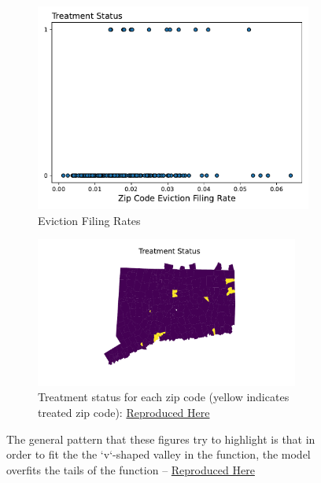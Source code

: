 \documentclass[a4paper,12pt]{article}
\begin{document}
\begin{figure}[htbp]
\centering
\begin{subfigure}{.48\textwidth}
    \centering
    \includegraphics[width=.95\linewidth]{figures/rtc/context/eviction_filing_rate_per_pop.pdf}
    \caption{Eviction Filing Rates}
    \label{fig:efr}
\end{subfigure}
\begin{subfigure}{.48\textwidth}
    \centering
\includegraphics[width=0.95\textwidth]{figures/rtc/maps/zip_code_status.pdf}  
        \caption{Treatment status for each zip code (yellow indicates treated zip code): \href{https://github.com/pharringtonp19/evictions/blob/main/scripts/joint/maps/treatment_status.py}{Reproduced Here}}
    \label{fig:treated_areas}
\end{subfigure}
\caption{The general pattern that these figures try to highlight is that in order to fit the the `v`-shaped valley in the function, the model overfits the tails of the function -- \href{https://github.com/pharringtonp19/jmp_paper/blob/main/notebooks/gradient_descent_motivating_example.ipynb}{Reproduced Here}}
\end{figure}
\end{document}
